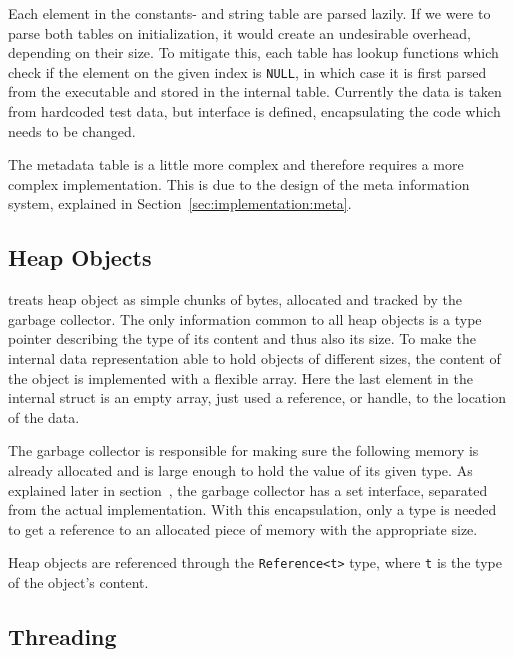 Each element in the constants- and string table are parsed lazily. If we were to
parse both tables on initialization, it would create an undesirable overhead,
depending on their size. To mitigate this, each table has lookup functions which
check if the element on the given index is {\tt NULL}, in which case it is first
parsed from the executable and stored in the internal table. Currently the data
is taken from hardcoded test data, but interface is defined, encapsulating the
code which needs to be changed.

The metadata table is a little more complex and therefore requires a more
complex implementation. This is due to the design of the meta information
system, explained in Section~\ref{sec:implementation:meta}.

\subsection{Heap Objects}

\thename{} treats heap object as simple chunks of bytes, allocated and tracked
by the garbage collector. The only information common to all heap objects is a
type pointer describing the type of its content and thus also its size. To make
the internal data representation able to hold objects of different sizes, the
content of the object is implemented with a flexible array. Here the last
element in the internal struct is an empty array, just used a reference, or
handle, to the location of the data.

The garbage collector is responsible for making sure the following memory is
already allocated and is large enough to hold the value of its given type. As
explained later in section~\cite{sec:separate-components:gc}, the garbage
collector has a set interface, separated from the actual implementation. With
this encapsulation, only a type is needed to get a reference to an allocated
piece of memory with the appropriate size.

Heap objects are referenced through the {\tt Reference<t>} type, where {\tt t}
is the type of the object's content.

\subsection{Threading}

